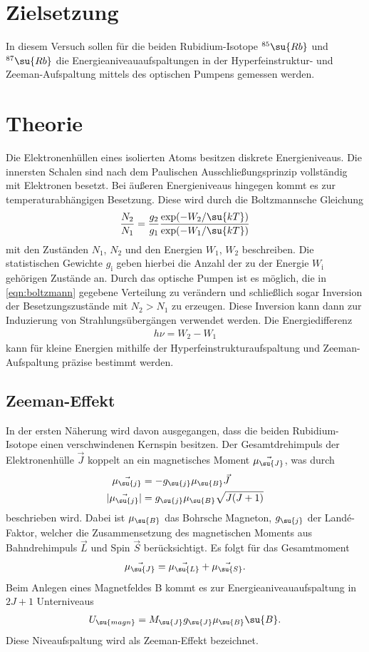 \section{Zielsetzung}
In diesem Versuch sollen für die beiden Rubidium-Isotope $^{85}\su{Rb}$ und $^{87}\su{Rb}$ die Energieaniveauaufspaltungen
in der Hyperfeinstruktur- und Zeeman-Aufspaltung mittels des optischen Pumpens gemessen werden.
\section{Theorie}
Die Elektronenhüllen eines isolierten Atoms besitzen diskrete Energieniveaus. Die innersten Schalen sind nach dem Paulischen Ausschließungsprinzip
vollständig mit Elektronen besetzt. Bei äußeren Energieniveaus hingegen kommt es
zur temperaturabhängigen Besetzung. Diese wird durch die Boltzmannsche Gleichung
\begin{align}
    \frac{N_{2}}{N_{1}} = \frac{g_{2}}{g_{1}}\frac{\exp(-W_{2}/\su{kT})}{\exp(-W_{1}/\su{kT})}
    \label{eqn:boltzmann}
\end{align}
mit den Zuständen $N_1$, $N_2$ und den Energien $W_1$, $W_2$
beschreiben. Die statistischen Gewichte $g_{\text{i}}$ geben hierbei die Anzahl der zu der Energie
$W_{\text{i}}$ gehörigen Zustände an.
Durch das optische Pumpen ist es möglich, die in \ref{eqn:boltzmann} gegebene Verteilung
zu verändern und schließlich sogar Inversion der Besetzungszustände mit $N_2 > N_1$ zu erzeugen.
Diese Inversion kann dann zur Induzierung von Strahlungsübergängen verwendet werden.
Die Energiedifferenz
\begin{align*}
    h\nu = W_{2}-W_{1}
\end{align*}
kann für kleine Energien mithilfe der Hyperfeinstrukturaufspaltung und
Zeeman-Aufspaltung präzise bestimmt werden.

\subsection{Zeeman-Effekt}
In der ersten Näherung wird davon ausgegangen, dass die beiden Rubidium-Isotope einen verschwindenen
Kernspin besitzen. Der Gesamtdrehimpuls der Elektronenhülle $\vec{J}$ koppelt an ein
magnetisches Moment $\vec{\mu_{\su{J}}}$, was durch
\begin{align*}
    \vec{\mu_{\su{j}}} &= -g_{\su{j}} \mu_{\su{B}} \vec{J} \\
    |\vec{\mu_{\su{j}}}| &= g_{\su{j}} \mu_{\su{B}} \sqrt{J(J+1)}
\end{align*}
beschrieben wird. Dabei ist $\mu_{\su{B}}$ das Bohrsche Magneton, $g_{\su{j}}$ der Landé-Faktor, welcher
die Zusammensetzung des magnetischen Moments aus Bahndrehimpuls $\vec{L}$ und Spin $\vec{S}$ berücksichtigt.
Es folgt für das Gesamtmoment
\begin{align*}
    \vec{\mu_{\su{J}}} = \vec{\mu_{\su{L}}} + \vec{\mu_{\su{S}}}.
\end{align*}
Beim Anlegen eines Magnetfeldes B kommt es zur Energieaniveauaufspaltung in $2J+1$ Unterniveaus
\begin{align*}
    U_{\su{magn}} = M_{\su{J}} g_{\su{J}} \mu_{\su{B}} \su{B}.
\end{align*}
Diese Niveaufspaltung wird als Zeeman-Effekt bezeichnet.

